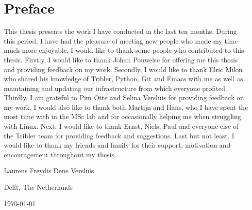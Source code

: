 \chapter*{Preface}
This thesis presents the work I have conducted in the last ten months.
During this period, I have had the pleasure of meeting new people who made my time much more enjoyable.
I would like to thank some people who contributed to this thesis.
Firstly, I would like to thank Johan Pouwelse for offering me this thesis and providing feedback on my work.
Secondly, I would like to thank Elric Milon who shared his knowledge of Tribler, Python, Git and Emacs with me as well as maintaining and updating our infrastructure from which everyone profited.
Thirdly, I am grateful to Pim Otte and Selina Versluis for providing feedback on my work.
I would also like to thank both Martijn and Hans, who I have spent the most time with in the MSc lab and for occasionally helping me when struggling with Linux.
Next, I would like to thank Ernst, Niels, Paul and everyone else of the Tribler team for providing feedback and suggestions.
Last but not least, I would like to thank my friends and family for their support, motivation and encouragement throughout my thesis.

\vspace{1\baselineskip}

\noindent
Laurens Freydis Dene Versluis

\vspace{1\baselineskip}

\noindent
Delft, The Netherlands

\noindent
\today